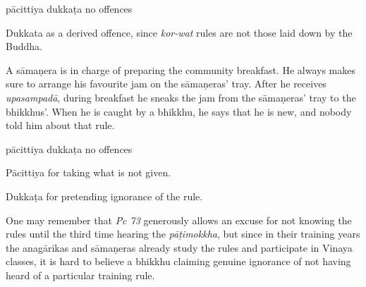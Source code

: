 \begin{exam}{\autoExamName}
\begin{problem*}
\begin{parts}
      \bigskip

      \begin{answers}{3}
        \bChoices
         pācittiya\eAns
         dukkaṭa\eAns
         no offences\eAns
        \eChoices
      \end{answers}

      \begin{solution}
        Dukkata as a derived offence, since \emph{kor-wat} rules are not those laid down by the Buddha.
      \end{solution}

      \bigskip

      \item A sāmaṇera is in charge of preparing the community breakfast. He
      always makes sure to arrange his favourite jam on the sāmaṇeras' tray.
      After he receives \emph{upasampadā}, during breakfast he sneaks the jam
      from the sāmaṇeras' tray to the bhikkhus'. When he is caught by a bhikkhu,
      he says that he is new, and nobody told him about that rule.

      \bigskip

      \begin{answers}{3}
        \bChoices
         pācittiya\eAns
         dukkaṭa\eAns
         no offences\eAns
        \eChoices
      \end{answers}

      \begin{solution}
        Pācittiya for taking what is not given.

        Dukkaṭa for pretending ignorance of the rule.

        One may remember that \emph{Pc 73} generously allows an excuse for not knowing the rules until the third time hearing the \emph{pāṭimokkha}, but since in their training years the anagārikas and sāmaṇeras already study the rules and participate in Vinaya classes, it is hard to believe a bhikkhu claiming genuine ignorance of not having heard of a particular training rule.
      \end{solution}

    \end{parts}

  \end{problem*}

\end{exam}
